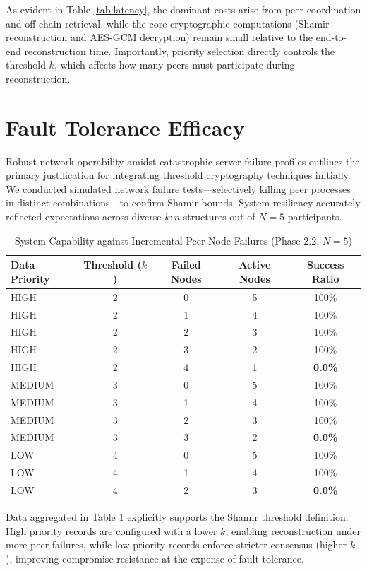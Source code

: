 As evident in Table \ref{tab:latency}, the dominant costs arise from peer coordination and off-chain retrieval, while the core cryptographic computations (Shamir reconstruction and AES-GCM decryption) remain small relative to the end-to-end reconstruction time. Importantly, priority selection directly controls the threshold $k$, which affects how many peers must participate during reconstruction.

\section{Fault Tolerance Efficacy}
Robust network operability amidst catastrophic server failure profiles outlines the primary justification for integrating threshold cryptography techniques initially. We conducted simulated network failure tests—selectively killing peer processes in distinct combinations—to confirm Shamir bounds. System resiliency accurately reflected expectations across diverse $k:n$ structures out of $N=5$ participants. 

\begin{table}[ht]
\centering
\begin{tabular}{|l|c|c|c|c|}
\hline
\textbf{Data Priority} & \textbf{Threshold ($k$)} & \textbf{Failed Nodes} & \textbf{Active Nodes} & \textbf{Success Ratio} \\
\hline
HIGH & 2 & 0 & 5 & 100\% \\
HIGH & 2 & 1 & 4 & 100\% \\
HIGH & 2 & 2 & 3 & 100\% \\
HIGH & 2 & 3 & 2 & 100\% \\
HIGH & 2 & 4 & 1 & \textbf{0.0\%} \\
\hline
MEDIUM & 3 & 0 & 5 & 100\% \\
MEDIUM & 3 & 1 & 4 & 100\% \\
MEDIUM & 3 & 2 & 3 & 100\% \\
MEDIUM & 3 & 3 & 2 & \textbf{0.0\%} \\
\hline
LOW & 4 & 0 & 5 & 100\% \\
LOW & 4 & 1 & 4 & 100\% \\
LOW & 4 & 2 & 3 & \textbf{0.0\%} \\
\hline
\end{tabular}
\caption{System Capability against Incremental Peer Node Failures (Phase 2.2, $N=5$)}
\label{tab:fault_tolerance}
\end{table}

Data aggregated in Table \ref{tab:fault_tolerance} explicitly supports the Shamir threshold definition. High priority records are configured with a lower $k$, enabling reconstruction under more peer failures, while low priority records enforce stricter consensus (higher $k$), improving compromise resistance at the expense of fault tolerance.

